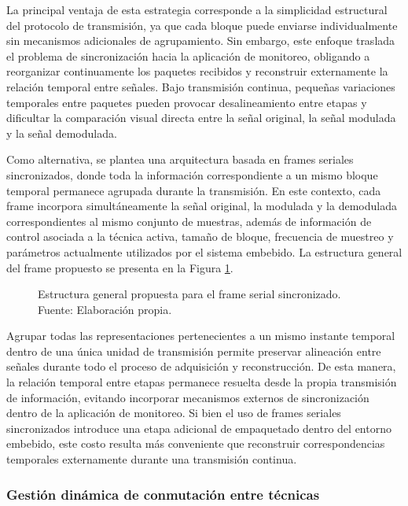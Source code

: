 La principal ventaja de esta estrategia corresponde a la simplicidad estructural del protocolo de transmisión, ya que cada bloque puede enviarse individualmente sin mecanismos adicionales de agrupamiento. Sin embargo, este enfoque traslada el problema de sincronización hacia la aplicación de monitoreo, obligando a reorganizar continuamente los paquetes recibidos y reconstruir externamente la relación temporal entre señales. Bajo transmisión continua, pequeñas variaciones temporales entre paquetes pueden provocar desalineamiento entre etapas y dificultar la comparación visual directa entre la señal original, la señal modulada y la señal demodulada.

Como alternativa, se plantea una arquitectura basada en frames seriales sincronizados, donde toda la información correspondiente a un mismo bloque temporal permanece agrupada durante la transmisión. En este contexto, cada frame incorpora simultáneamente la señal original, la modulada y la demodulada correspondientes al mismo conjunto de muestras, además de información de control asociada a la técnica activa, tamaño de bloque, frecuencia de muestreo y parámetros actualmente utilizados por el sistema embebido. La estructura general del frame propuesto se presenta en la Figura \ref{fig:frame_structure}.

\begin{figure}[H]
    \centering
    
    \caption{Estructura general propuesta para el frame serial sincronizado. Fuente: Elaboración propia.}
    \label{fig:frame_structure}
\end{figure}

Agrupar todas las representaciones pertenecientes a un mismo instante temporal dentro de una única unidad de transmisión permite preservar alineación entre señales durante todo el proceso de adquisición y reconstrucción. De esta manera, la relación temporal entre etapas permanece resuelta desde la propia transmisión de información, evitando incorporar mecanismos externos de sincronización dentro de la aplicación de monitoreo. Si bien el uso de frames seriales sincronizados introduce una etapa adicional de empaquetado dentro del entorno embebido, este costo resulta más conveniente que reconstruir correspondencias temporales externamente durante una transmisión continua.

\subsubsection{Gestión dinámica de conmutación entre técnicas}

